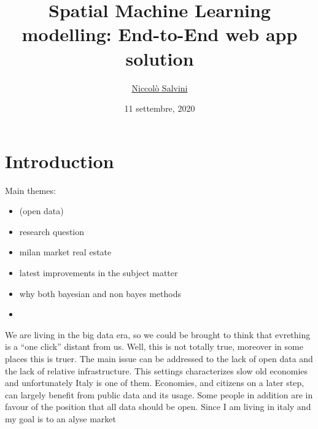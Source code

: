 \documentclass[
  12pt,
  a4paper,
  oneside]{book}
\title{Spatial Machine Learning modelling: End-to-End web app solution}
\author{\href{https://niccolosalvini.netlify.app/}{Niccolò Salvini}}
\date{11 settembre, 2020}
\let\oldmaketitle\maketitle
\begin{document}
\maketitle


\newpage

\let\maketitle\oldmaketitle
\maketitle

{
\setcounter{tocdepth}{1}
\tableofcontents
}
\hypertarget{intro}{%
\chapter{Introduction}\label{intro}}

Main themes:

\begin{itemize}
\item
  (open data)
\item
  research question
\item
  milan market real estate
\item
  latest improvements in the subject matter
\item
  why both bayesian and non bayes methods
\item
\end{itemize}

We are living in the big data era, so we could be brought to think that evrething is a ``one click'' distant from us. Well, this is not totally true, moreover in some places this is truer. The main issue can be addressed to the lack of open data and the lack of relative infrastructure. This settings characterizes slow old economies and unfortunately Italy is one of them. Economies, and citizens on a later step, can largely benefit from public data and its usage. Some people in addition are in favour of the position that all data should be open.
Since I am living in italy and my \citep{lovelace_geocomputation_2019} goal is to an \citep{R-furrr} alyse market
\end{document}
